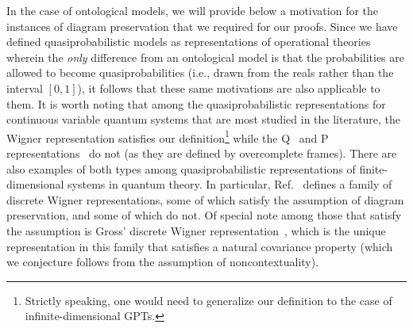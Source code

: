 \documentclass[onecolum,aps,groupedaddress,nofootinbib]{revtex4-2}
\newcommand{\david}{\color{blue}}
\newcommand{\blk}{\color{black}}
\begin{document}
In the case of ontological models, we will provide below a motivation for the instances of diagram preservation that we required for our proofs. Since we have defined quasiprobabilistic models as representations of operational theories wherein the {\em only} difference from an ontological model is that the probabilities are allowed to become quasiprobabilities (i.e., drawn from the reals rather than the interval $[0,1]$), it follows that these same motivations are also applicable to them.
It is worth noting that among the quasiprobabilistic representations for continuous variable quantum systems that are most studied in the literature, the Wigner representation satisfies our definition\footnote{Strictly speaking, one would need to generalize our definition to the case of infinite-dimensional GPTs.} while the Q~\cite{Husimi} and P representations~\cite{Pfunc1,Pfunc2} do not (as they are defined by overcomplete frames).  There are also examples of both types among quasiprobabilistic representations of finite-dimensional systems in quantum theory.
In particular, Ref.~\cite{citeGHW} defines a family of discrete Wigner representations, some of which satisfy the assumption of diagram preservation, and some of which do not. Of special note among those that satisfy the assumption is Gross' discrete Wigner representation~\cite{gross2006},  which is the unique representation in this family that satisfies a natural covariance property (which we conjecture follows from the assumption of noncontextuality).
\end{document}
